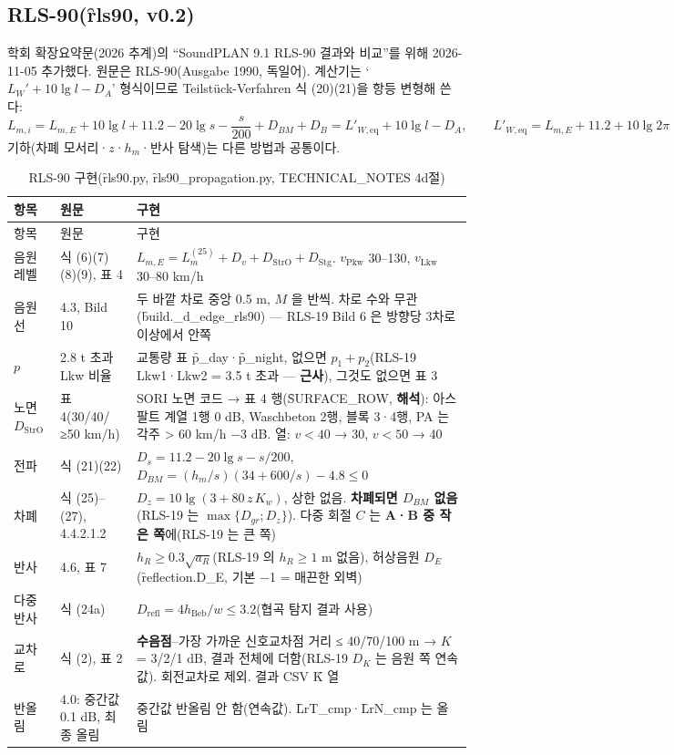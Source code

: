 \documentclass[10.5pt,a4paper]{article}
\begin{document}
\subsection{RLS-90(\f{rls90}, v0.2)}\label{sec:rls90}
학회 확장요약문(2026 추계)의 ``SoundPLAN 9.1 RLS-90 결과와 비교''를 위해 2026-11-05 추가했다. 원문은 RLS-90(Ausgabe 1990, 독일어). 계산기는 `$L_W' + 10\lg l - D_A$' 형식이므로 Teilstück-Verfahren 식 (20)(21)을 항등 변형해 쓴다:
\begin{equation*}
L_{m,i} = L_{m,E} + 10\lg l + 11.2 - 20\lg s - \frac{s}{200} + D_{BM} + D_B = L'_{W,\mathrm{eq}} + 10\lg l - D_A,\qquad L'_{W,\mathrm{eq}} = L_{m,E} + 11.2 + 10\lg 2\pi
\end{equation*}
기하(차폐 모서리·$z$·$h_m$·반사 탐색)는 다른 방법과 공통이다.
\begin{longtable}{P{20mm}P{42mm}P{90mm}}
\caption{RLS-90 구현(\f{rls90.py}, \f{rls90\_propagation.py}, TECHNICAL\_NOTES 4d절)}\label{tab:rls90}\\
\toprule 항목 & 원문 & 구현 \\ \midrule\endfirsthead
\toprule 항목 & 원문 & 구현 \\ \midrule\endhead
음원 레벨 & 식 (6)(7)(8)(9), 표 4 & $L_{m,E} = L_m^{(25)} + D_v + D_\mathrm{StrO} + D_\mathrm{Stg}$. $v_\mathrm{Pkw}$ 30–130, $v_\mathrm{Lkw}$ 30–80 km/h \\
음원선 & 4.3, Bild 10 & 두 바깥 차로 중앙 0.5 m, $M$ 을 반씩. 차로 수와 무관(\f{build.\_d\_edge\_rls90}) — RLS-19 Bild 6 은 방향당 3차로 이상에서 안쪽 \\
$p$ & 2.8 t 초과 Lkw 비율 & 교통량 표 \f{p\_day}·\f{p\_night}, 없으면 $p_1 + p_2$(RLS-19 Lkw1·Lkw2 = 3.5 t 초과 — \textbf{근사}), 그것도 없으면 표 3 \\
노면 $D_\mathrm{StrO}$ & 표 4(30/40/≥50 km/h) & SORI 노면 코드 → 표 4 행(\f{SURFACE\_ROW}, \textbf{해석}): 아스팔트 계열 1행 0 dB, Waschbeton 2행, 블록 3·4행, PA 는 각주 > 60 km/h −3 dB. 열: $v < 40$ → 30, $v < 50$ → 40 \\
전파 & 식 (21)(22) & $D_s = 11.2 - 20\lg s - s/200$, $D_{BM} = (h_m/s)(34 + 600/s) - 4.8 \le 0$ \\
차폐 & 식 (25)–(27), 4.4.2.1.2 & $D_z = 10\lg(3 + 80\,z\,K_w)$, 상한 없음. \textbf{차폐되면 $D_{BM}$ 없음}(RLS-19 는 $\max\{D_{gr}; D_z\}$). 다중 회절 $C$ 는 \textbf{A·B 중 작은 쪽}에(RLS-19 는 큰 쪽) \\
반사 & 4.6, 표 7 & $h_R \ge 0.3\sqrt{a_R}$(RLS-19 의 $h_R \ge 1$ m 없음), 허상음원 $D_E$(\f{reflection.D\_E}, 기본 −1 = 매끈한 외벽) \\
다중반사 & 식 (24a) & $D_\mathrm{refl} = 4h_\mathrm{Beb}/w \le 3.2$(협곡 탐지 결과 사용) \\
교차로 & 식 (2), 표 2 & \textbf{수음점}–가장 가까운 신호교차점 거리 ≤ 40/70/100 m → $K$ = 3/2/1 dB, 결과 전체에 더함(RLS-19 $D_K$ 는 음원 쪽 연속값). 회전교차로 제외. 결과 CSV \f{K} 열 \\
반올림 & 4.0: 중간값 0.1 dB, 최종 올림 & 중간값 반올림 안 함(연속값). \f{LrT\_cmp}·\f{LrN\_cmp} 는 올림 \\
\bottomrule
\end{longtable}
\end{document}

